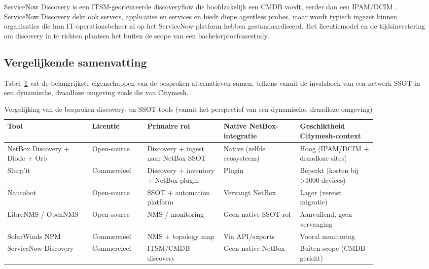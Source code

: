 ServiceNow Discovery is een ITSM-georiënteerde discoveryflow die hoofdzakelijk een CMDB voedt, eerder dan een IPAM/DCIM \autocite{ServiceNowDiscovery}. ServiceNow Discovery dekt ook servers, applicaties en services en biedt diepe agentless probes, maar wordt typisch ingezet binnen organisaties die hun IT-operationsbeheer al op het ServiceNow-platform hebben gestandaardiseerd. Het licentiemodel en de tijdsinvestering om discovery in te richten plaatsen het buiten de scope van een bachelorproefcasestudy.

\subsection{Vergelijkende samenvatting}

Tabel~\ref{tab:tools-vergelijking} vat de belangrijkste eigenschappen van de besproken alternatieven samen, telkens vanuit de invalshoek van een netwerk-SSOT in een dynamische, draadloze omgeving zoals die van Citymesh.

\begin{table}[H]
  \centering
  \caption[Vergelijking van besproken discovery-/SSOT-tools]{Vergelijking van de besproken discovery- en SSOT-tools (vanuit het perspectief van een dynamische, draadloze omgeving)}
  \label{tab:tools-vergelijking}
  \footnotesize
  \begin{tabular}{p{0.20\linewidth} p{0.13\linewidth} p{0.18\linewidth} p{0.18\linewidth} p{0.18\linewidth}}
    \toprule
    \textbf{Tool} & \textbf{Licentie} & \textbf{Primaire rol} & \textbf{Native NetBox-integratie} & \textbf{Geschiktheid Citymesh-context} \\
    \midrule
    NetBox Discovery + Diode + Orb & Open-source & Discovery + ingest naar NetBox SSOT & Native (zelfde ecosysteem) & Hoog (IPAM/DCIM + draadloze sites) \\
    Slurp'it & Commercieel & Discovery + inventory + NetBox-plugin & Plugin & Beperkt (kosten bij \textgreater{}1000 devices) \\
    Nautobot & Open-source & SSOT + automation platform & Vervangt NetBox & Lager (vereist migratie) \\
    LibreNMS / OpenNMS & Open-source & NMS / monitoring & Geen native SSOT-rol & Aanvullend, geen vervanging \\
    SolarWinds NPM & Commercieel & NMS + topology map & Via API/exports & Vooral monitoring \\
    ServiceNow Discovery & Commercieel & ITSM/CMDB discovery & Geen native NetBox & Buiten scope (CMDB-gericht) \\
    \bottomrule
  \end{tabular}
\end{table}

